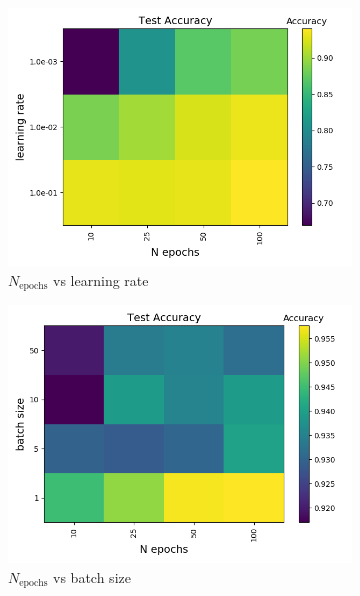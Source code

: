\documentclass[a4paper]{article}
\newcommand{\Nepochs}{N_{\text{epochs}}}
\begin{document}
\begin{figure}[H]
  \centering
  \begin{subfigure}{0.49\textwidth}
    \includegraphics[scale=0.45]{../figures/task_d/test/heatmap_test_lr_constant_Nhyp443431_Accuracy_n_epochs_eta0.png}
    \caption{$\Nepochs$ vs learning rate}
  \end{subfigure}
  \begin{subfigure}{0.49\textwidth}
    \includegraphics[scale=0.45]{../figures/task_d/test/heatmap_test_lr_constant_Nhyp443431_Accuracy_n_epochs_bsize.png}
    \caption{$\Nepochs$ vs batch size}
  \end{subfigure}\\
  \begin{subfigure}{0.49\textwidth}

\end{subfigure}
\end{figure}
\end{document}
